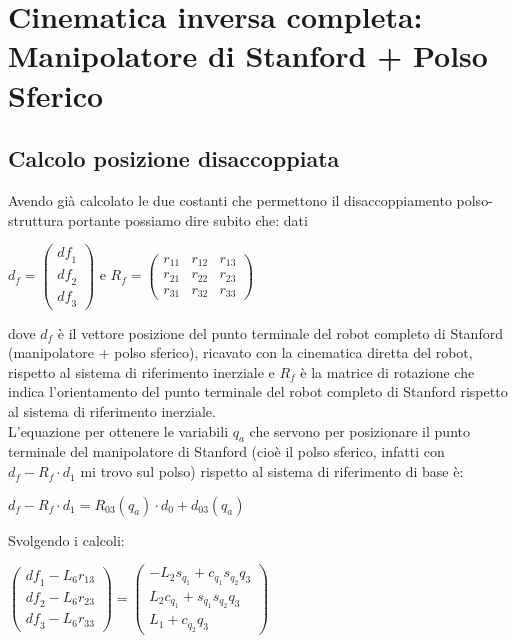 \documentclass[a4paper,12pt]{article}
\begin{document}
\section{Cinematica inversa completa: Manipolatore di Stanford + Polso Sferico}
\subsection{Calcolo posizione disaccoppiata}

Avendo già calcolato le due costanti che permettono il disaccoppiamento polso-struttura portante possiamo dire subito che: dati

\begin{center}
$d_f=\begin{pmatrix}{{\mathit{df}}_1}\\
{{\mathit{df}}_2}\\
{{\mathit{df}}_3}\end{pmatrix}$ e $R_f=\begin{pmatrix}{r_{11}} & {r_{12}} & {r_{13}}\\
{r_{21}} & {r_{22}} & {r_{23}}\\
{r_{31}} & {r_{32}} & {r_{33}}\end{pmatrix}$
\end{center}

\begin{flushleft}
dove $d_f$ è il vettore posizione del punto terminale del robot completo di Stanford (manipolatore + polso sferico), ricavato con la cinematica diretta del robot, rispetto al sistema di riferimento inerziale e $R_f$ è la matrice di rotazione che indica l'orientamento del punto terminale del robot completo di Stanford rispetto al sistema di riferimento inerziale. \\
L'equazione per ottenere le variabili $q_a$ che servono per posizionare il punto terminale del manipolatore di Stanford (cioè il polso sferico, infatti con $d_f- R_f \cdot d_1$ mi trovo sul polso) rispetto al sistema di riferimento di base è:
\end{flushleft}

\begin{center}
$d_f- R_f \cdot d_1 = R_{03}(q_a) \cdot d_0 + d_{03}(q_a)$ 
\end{center}

Svolgendo i calcoli:

\begin{center}
$\begin{pmatrix}{{\mathit{df}}_1}-{L_6} {r_{13}}\\
{{\mathit{df}}_2}-{L_6} {r_{23}}\\
{{\mathit{df}}_3}-{L_6} {r_{33}}\end{pmatrix}=\begin{pmatrix}-{L_2} {s_{{q_1}}}+{c_{{q_1}}} {s_{{q_2}}} {q_3}\\
{L_2} {c_{{q_1}}}+{s_{{q_1}}} {s_{{q_2}}} {q_3}\\
{L_1}+{c_{{q_2}}} {q_3}\end{pmatrix}$
\end{center}
\end{document}
